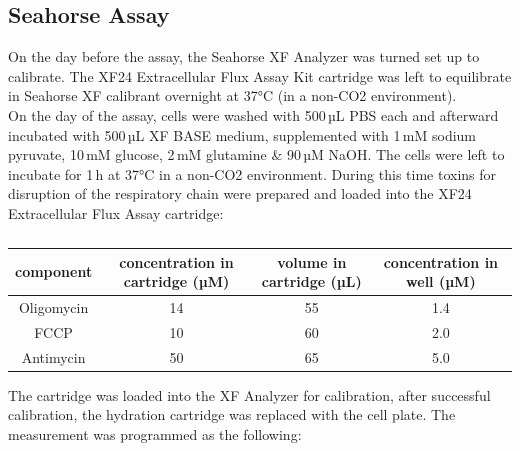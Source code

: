     \subsection{Seahorse Assay}
    On the day before the assay, the Seahorse XF Analyzer was turned set up to calibrate. The XF24 Extracellular Flux Assay Kit cartridge was left to equilibrate in Seahorse XF calibrant overnight at 37°C (in a non-CO2 environment).\\
    On the day of the assay, cells were washed with 500\,µL PBS each and afterward incubated with 500\,µL XF BASE medium, supplemented with 1\,mM sodium pyruvate, 10\,mM glucose, 2\,mM glutamine \& 90\,µM NaOH. The cells were left to incubate for 1\,h at 37°C in a non-CO2 environment. During this time toxins for disruption of the respiratory chain were prepared and loaded into the XF24 Extracellular Flux Assay cartridge:

    \begin{table}[h]
    \capstart
    \centering
    \begin{minipage}{\captionwidth}
        \caption[toxins for seahorse]{}
        \label{tab:seahorse_toxins}
    \end{minipage}
    \begin{tabular}{|c|c|c|c|}
        \hline
        component  & concentration in cartridge (µM) & volume in cartridge (µL) & concentration in well (µM) \\ \hline
        Oligomycin & 14                             & 55                      & 1.4                        \\
        FCCP       & 10                             & 60                      & 2.0                        \\
        Antimycin  & 50                             & 65                      & 5.0                        \\ \hline
    \end{tabular}
    \end{table}

    The cartridge was loaded into the XF Analyzer for calibration, after successful calibration, the hydration cartridge was replaced with the cell plate. The measurement was programmed as the following:


